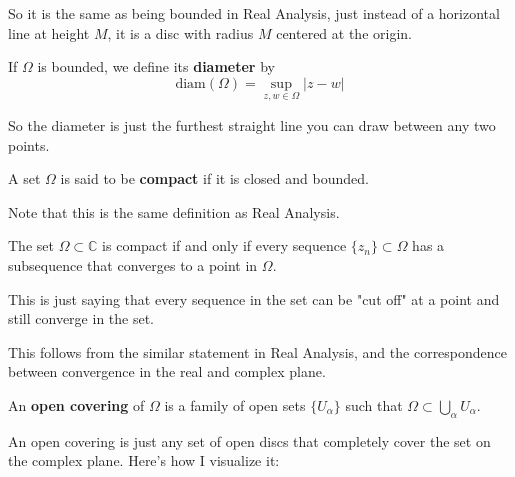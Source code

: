\documentclass[12pt]{article}
\begin{document}
So it is the same as being bounded in Real Analysis, just instead of a horizontal line at height $M$, 
it is a disc with radius $M$ centered at the origin. 

\begin{definition}
  If $\Omega$ is bounded, we define its \textbf{diameter} by 
  $$ \text{diam}(\Omega) = \sup_{z,w \in \Omega} \vert z - w \vert $$
\end{definition}

So the diameter is just the furthest straight line you can draw between any two points. 

\begin{definition}
  A set $\Omega$ is said to be \textbf{compact} if it is closed and bounded.
\end{definition}

Note that this is the same definition as Real Analysis.

\begin{theorem}{}
  The set $\Omega \subset \mathbb{C}$ is compact if and only if every sequence $\{ z_n \} \subset \Omega$ 
  has a subsequence that converges to a point in $\Omega$.
\end{theorem}

This is just saying that every sequence in the set can be "cut off" at a point and still converge
in the set.

\begin{newproof}
  This follows from the similar statement in Real Analysis, and the correspondence between convergence in
  the real and complex plane.
\end{newproof}

\begin{definition}
  An \textbf{open covering} of $\Omega$ is a family of open sets $\{ U_{\alpha}\}$ such that 
    $\Omega \subset \bigcup_{\alpha} U_{\alpha}$.
\end{definition}

An open covering is just any set of open discs that completely cover the set on the complex plane. Here's 
how I visualize it:
\end{document}
